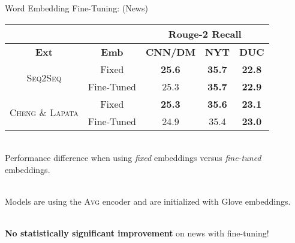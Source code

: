 \begin{frame}{Word Embedding Fine-Tuning: (News)}
  \begin{center}
    \begin{tabular}{ccccc}
 & & \multicolumn{3}{c}{\textbf{Rouge-2 Recall}}\\
      \toprule
        \textbf{Ext} & \textbf{Emb}  & 
           \textbf{CNN/DM} & 
           \textbf{NYT} & 
           \textbf{DUC} \\
      \midrule
      \multirow{2}{*}{\textsc{Seq2Seq}} 
        & Fixed & \textbf{25.6} & \textbf{35.7} & \textbf{22.8} \\
        & Fine-Tuned &         25.3  & \textbf{35.7} & \textbf{22.9} \\
      \hline
      \multirow{2}{*}{\textsc{Cheng \& Lapata}} 
        & Fixed & \textbf{25.3} & \textbf{35.6} & \textbf{23.1} \\
        & Fine-Tuned &         24.9  &         35.4  & \textbf{23.0} \\
      \bottomrule
  \end{tabular}
 \end{center}

 ~\\
 
 Performance difference when using \textit{fixed} embeddings versus 
 \textit{fine-tuned} embeddings.
 
  ~\\

  Models are using the \textsc{Avg} encoder and are initialized with 
  Glove embeddings. 

  ~\\

  \textbf{No statistically significant improvement} on news with fine-tuning!

\end{frame}

